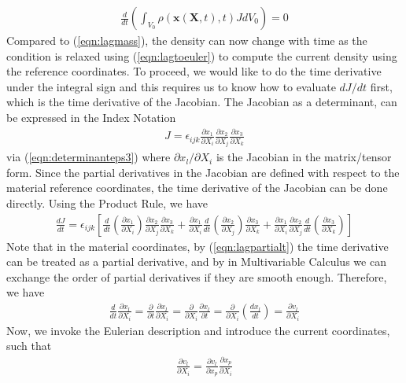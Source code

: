 \begin{align}
\frac{d}{dt}\left(\int_{V_0} \rho(\textbf{x}(\textbf{X},t),t) JdV_0 \right) = 0 \label{eqn:eulermassdt}   
\end{align}
Compared to (\ref{eqn:lagmass}), the density can now change with time as the condition is relaxed using (\ref{eqn:lagtoeuler}) to compute the current density using the reference coordinates. To proceed, we would like to do the time derivative under the integral sign and this requires us to know how to evaluate $dJ/dt$ first, which is the time derivative of the Jacobian. The Jacobian as a determinant, can be expressed in the Index Notation
\begin{align}
J = \epsilon_{ijk} \frac{\partial x_1}{\partial X_i}\frac{\partial x_2}{\partial X_j}\frac{\partial x_3}{\partial X_k} \label{eqn:Jdefn}
\end{align}
via (\ref{eqn:determinanteps3}) where $\partial x_l/\partial X_i$ is the Jacobian in the matrix/tensor form. Since the partial derivatives in the Jacobian are defined with respect to the material reference coordinates, the time derivative of the Jacobian can be done directly. Using the Product Rule, we have
\begin{align}
\frac{dJ}{dt} =  \epsilon_{ijk} [\frac{d}{dt}(\frac{\partial x_1}{\partial X_i})\frac{\partial x_2}{\partial X_j}\frac{\partial x_3}{\partial X_k} +  \frac{\partial x_1}{\partial X_i}\frac{d}{dt}(\frac{\partial x_2}{\partial X_j})\frac{\partial x_3}{\partial X_k} +  \frac{\partial x_1}{\partial X_i}\frac{\partial x_2}{\partial X_j}\frac{d}{dt}(\frac{\partial x_3}{\partial X_k})]
\label{eqn:dJdt1}
\end{align}
Note that in the material coordinates, by (\ref{eqn:lagpartialt}) the time derivative can be treated as a partial derivative, and by  in Multivariable Calculus we can exchange the order of partial derivatives if they are smooth enough. Therefore, we have
\begin{align}
\frac{d}{dt}\frac{\partial x_l}{\partial X_i} = \frac{\partial}{\partial t}\frac{\partial x_l}{\partial X_i} = \frac{\partial}{\partial X_i}\frac{\partial x_l}{\partial t} = \frac{\partial}{\partial X_i}(\frac{d x_l}{dt}) = \frac{\partial v_l}{\partial X_i}
\end{align}
Now, we invoke the Eulerian description and introduce the current coordinates, such that
\begin{align}
\frac{\partial v_l}{\partial X_i} = \frac{\partial v_l}{\partial x_p}\frac{\partial x_p}{\partial X_i}
\end{align}
